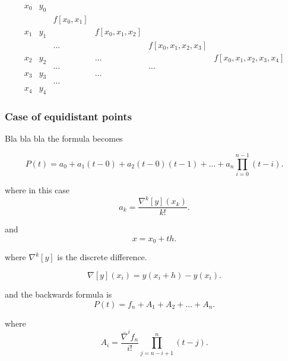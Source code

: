 \documentclass{report}
\begin{document}
\[
	\begin{array}{cccccc}
		x_0 & y_0                                                                             \\
		    &     & f[x_0,x_1]                                                                \\
		x_1 & y_1 &            & f[x_0,x_1,x_2]                                               \\
		    &     & \dots      &                & f[x_0,x_1,x_2,x_3]                          \\
		x_2 & y_2 &            & \dots          &                    & f[x_0,x_1,x_2,x_3,x_4] \\
		    &     & \dots      &                & \dots                                       \\
		x_3 & y_3 &            & \dots                                                        \\
		    &     & \dots                                                                     \\
		x_4 & y_4
	\end{array}
\]


\subsubsection{Case of equidistant points}
Bla bla bla the formula becomes

\[
	P(t) = a_0 + a_1(t-0) + a_2(t-0)(t-1) + \dots + a_n \prod_{i=0}^{n-1}(t-i)
	.\]

where in this case
\[
	a_k = \frac{\nabla^k[y](x_k)}{k!}
	.\]

and
\[
	x = x_0 +th
	.\]

where $\nabla^k[y]$ is the discrete difference.

\[
	\nabla[y](x_i) = y(x_i+h)-y(x_i)
	.\]

and the backwards formula is
\[
	P(t) = f_n + A_1 + A_2 + \dots + A_n
	.\]

where
\[
	A_i = \frac{\bar{\nabla}^if_n}{i!}\prod_{j=n-i+1}^n (t-j)
	.\]
\end{document}
